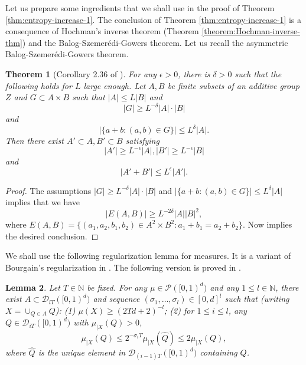 \documentclass[a4paper,11pt]{amsart}
\newtheorem{theorem}{Theorem}[section]
\newtheorem{lemma}[theorem]{Lemma}
\theoremstyle{definition}
\numberwithin{equation}{section}
\def\D{\mathcal{D}}
\def\cP{\mathcal P}
\def\N{\mathbb N}
\def\Z{\mathbb Z}
\begin{document}

Let us prepare some ingredients that we shall use in the proof of Theorem \ref{thm:entropy-increase-1}.
The conclusion of Theorem \ref{thm:entropy-increase-1} is a consequence of Hochman's inverse theorem (Theorem \ref{theorem:Hochman-inverse-thm}) and the Balog-Szemer\'edi-Gowers theorem. 
Let us recall the asymmetric Balog-Szemer\'edi-Gowers theorem. 

\begin{theorem}[Corollary 2.36 of \cite{TaoVu-book}]\label{thm:Balog-Szemeredi-Gowers}
For any $\epsilon>0$, there is $\delta>0$ such that the following holds for $L$ large enough.  Let $A, B$ be finite subsets of an additive group $Z$ and $G\subset A\times B$ such that $|A|\le L|B|$ and 
\[
|G|\ge L^{-\delta} |A|\cdot|B|
\] 
and 
\[
|\{a+b:(a,b)\in G\}|\le L^\delta|A|.
\]
Then there exist $A'\subset A, B'\subset B$ satisfying
\[
|A'|\ge L^{-\epsilon}|A|,  |B'|\ge L^{-\epsilon}|B|
\]
and
\[|A'+B'|\le L^{\epsilon}|A'|.\]
\end{theorem}
\begin{proof}
The assumptions $|G|\ge L^{-\delta} |A|\cdot|B|$ and $|\{a+b:(a,b)\in G\}|\le L^\delta|A|$ implies that we have
\[
|E(A,B)|\ge L^{-2\delta}|A||B|^2,
\]
where $E(A,B)=\{(a_1,a_2,b_1,b_2)\in A^2\times B^2: a_1+b_1=a_2+b_2\}.$ Now  \cite[Corollary 2.36]{TaoVu-book} implies the desired conclusion.
\end{proof}

We shall use the following regularization lemma for measures. It is a variant of Bourgain's regularization in \cite{Bourgain2010}.
The following version is proved in \cite[Lemma 3.4]{KS2019}.
\begin{lemma}\label{lemma:regularization measures}
Let $T\in \N$ be fixed.  For any $\mu\in \cP([0,1)^d)$ and any $1\le l\in \N$, there exist $A\subset \D_{lT}([0,1)^d)$ {\color{black} and sequence $(\sigma_1,\ldots,\sigma_l)\in [0,d]^l$} such that (writing $X=\cup_{Q\in A}Q$): (1) $\mu(X)\ge (2Td+2)^{-l}$; (2) for $1\le i\le l$,  any $Q\in  \D_{iT}([0,1)^d)$ with $\mu_{|X}(Q)>0$,   {\color{black} 
\[\mu_{|X}(Q)\le 2^{-\sigma_i T} \mu_{|X}(\widehat{Q})  \le 2\mu_{|X}(Q),\]
where $\widehat{Q}$ is the unique element in $ \D_{(i-1)T}([0,1)^d)$ containing $Q$.}
\end{lemma}
\end{document}

